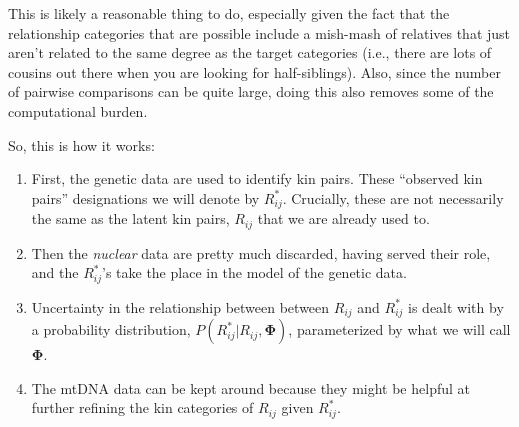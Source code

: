 \documentclass[11pt, oneside]{article}   	%
\newcommand{\BPhi}{\mathbf{\Phi}}
\begin{document}
This is likely a reasonable thing to do, especially given the fact that the relationship categories that are
possible include a mish-mash of relatives that just aren't related to the same degree as the target categories 
(i.e., there are lots of cousins out there when you are looking for half-siblings).  Also, since the number of pairwise
comparisons can be quite large, doing this also removes some of the computational burden.

So, this is how it works:
\begin{enumerate}
\item First, the genetic data are used to identify kin pairs.  These ``observed kin pairs'' designations
we will denote by $R_{ij}^*$.  Crucially, these are not necessarily the same as the latent kin pairs,
$R_{ij}$ that we are already used to.
\item Then the {\em nuclear} data are pretty much discarded, having served their role, and the $R_{ij}^*$'s take the
place in the model of the genetic data.
\item Uncertainty in the relationship between between $R_{ij}$ and $R^*_{ij}$ is dealt with by
a probability distribution, $P(R^*_{ij}| R_{ij}, \BPhi)$, parameterized by what we will call $\BPhi$.
\item The mtDNA data can be kept around because they might be helpful at further refining the
kin categories of $R_{ij}$ given $R_{ij}^*$.
\end{enumerate}
\end{document}
